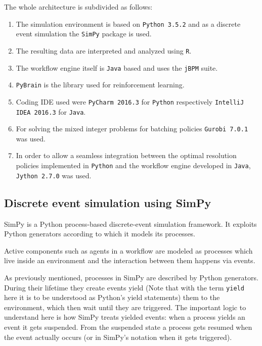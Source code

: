 \documentclass{seal_thesis}
\begin{document}
The whole architecture is subdivided as follows:
\begin{enumerate}
	\item The simulation environment is based on \texttt{Python 3.5.2} and as a discrete event simulation the \texttt{SimPy} package is used.
	\item The resulting data are interpreted and analyzed using \texttt{R}.
	\item The workflow engine itself is \texttt{Java} based and uses the \texttt{jBPM} suite.
	\item \texttt{PyBrain} is the library used for reinforcement learning.
	\item Coding IDE used were \texttt{PyCharm 2016.3} for \texttt{Python} respectively \texttt{IntelliJ IDEA 2016.3} for \texttt{Java}.
	\item For solving the mixed integer problems for batching policies \texttt{Gurobi 7.0.1} was used.
	\item In order to allow a seamless integration between the optimal resolution policies implemented in \texttt{Python} and the workflow engine developed in \texttt{Java}, \texttt{Jython 2.7.0} was used.
\end{enumerate}

\subsection{Discrete event simulation using SimPy}

SimPy is a Python process-based discrete-event simulation framework. It exploits Python generators according to which it models its processes.

Active components such as agents in a workflow are modeled as processes which live inside an environment and the interaction between them happens via events.

As previously mentioned, processes in SimPy are described by Python generators. During their lifetime they create events yield (Note that with the term \texttt{yield} here it is to be understood as Python's yield statements) them to the environment, which then wait until they are triggered. The important logic to understand here is how SimPy treats yielded events: when a process yields an event it gets suspended. From the suspended state a process gets resumed when the event actually occurs (or in SimPy's notation when it gets triggered).
\end{document}

